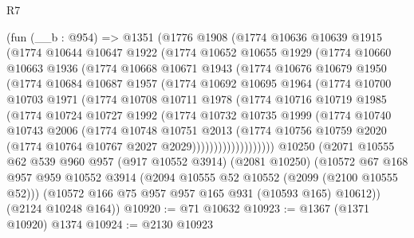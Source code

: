 \begin{lexlean}{R7}
\begin{coremodule}
    (fun (__b : @954) =>
    @1351
      (@1776
        @1908
        (@1774
          @10636
          @10639
          @1915
          (@1774
            @10644
            @10647
            @1922
            (@1774
              @10652
              @10655
              @1929
              (@1774
                @10660
                @10663
                @1936
                (@1774
                  @10668
                  @10671
                  @1943
                  (@1774
                    @10676
                    @10679
                    @1950
                    (@1774
                      @10684
                      @10687
                      @1957
                      (@1774
                        @10692
                        @10695
                        @1964
                        (@1774
                          @10700
                          @10703
                          @1971
                          (@1774
                            @10708
                            @10711
                            @1978
                            (@1774
                              @10716
                              @10719
                              @1985
                              (@1774
                                @10724
                                @10727
                                @1992
                                (@1774
                                  @10732
                                  @10735
                                  @1999
                                  (@1774
                                    @10740
                                    @10743
                                    @2006
                                    (@1774
                                      @10748
                                      @10751
                                      @2013
                                      (@1774
                                        @10756
                                        @10759
                                        @2020
                                        (@1774 @10764 @10767 @2027 @2029)))))))))))))))))))
    @10250
    (@2071
      @10555
      @62
      @539
      @960
      @957
      (@917 @10552 @3914)
      (@2081 @10250)
      (@10572
        @67
        @168
        @957
        @959
        @10552
        @3914
        (@2094 @10555 @52 @10552 (@2099 (@2100 @10555 @52)))
        (@10572 @166 @75 @957 @957 @165 @931 (@10593 @165) @10612))
      (@2124 @10248 @164))
@10920 := @71 @10632
@10923 := @1367 (@1371 @10920) @1374
@10924 := @2130 @10923

\end{coremodule}
\end{lexlean}
